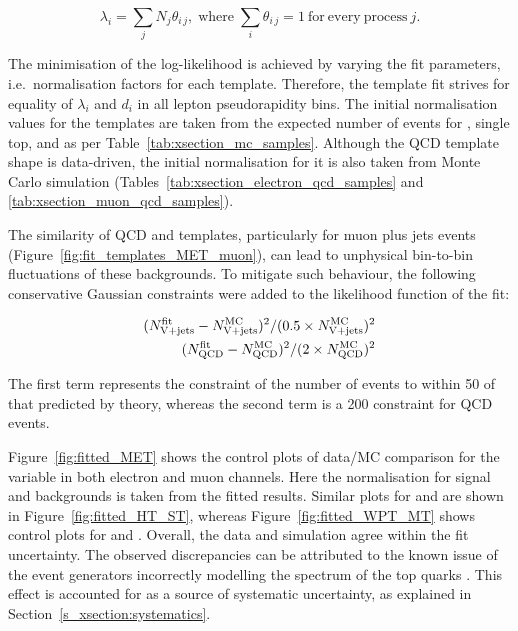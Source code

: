 \begin{equation}
\label{eq:xsection_templates_normalisation}
\lambda_i=\sum\limits_{j}N_j\theta_{i\,j},\;\mathrm{where}\;\sum\limits_{i}\theta_{i\,j}=1~\mathrm{for~every~process}~j.
\end{equation}

The minimisation of the log-likelihood is achieved by varying the fit parameters, i.e.\ normalisation factors for each
template. Therefore, the template fit strives for equality of $\lambda_i$ and $d_i$ in all lepton pseudorapidity bins.
The initial normalisation values for the templates are taken from the expected number of events for \ttbar, single top,
\WpJets and \ZpJets as per Table~\ref{tab:xsection_mc_samples}. Although the QCD template shape is data-driven, the
initial normalisation for it is also taken from Monte Carlo simulation (Tables~\ref{tab:xsection_electron_qcd_samples}
and \ref{tab:xsection_muon_qcd_samples}).

The similarity of QCD and \VpJets templates, particularly for muon plus jets events
(Figure~\ref{fig:fit_templates_MET_muon}), can lead to unphysical bin-to-bin fluctuations of these backgrounds. To
mitigate such behaviour, the following conservative Gaussian constraints were added to the likelihood function of the
fit:

\begin{align}
\label{eq:xsection_fit_constraints}
(N_{\mathrm{V}+\textrm{jets}}^\mathrm{fit}-N_{\mathrm{V}+\textrm{jets}}^\mathrm{MC})^2/(0.5 \times N_{\mathrm{V}+\textrm{jets}}^\mathrm{MC})^2 \\
(N_\mathrm{QCD}^\mathrm{fit}-N_\mathrm{QCD}^\mathrm{MC})^2/(2\times N_\mathrm{QCD}^\mathrm{MC})^2
\end{align}

The first term represents the constraint of the number of \VpJets events to within \SI{50}{\pc} of that predicted by
theory, whereas the second term is a \SI{200}{\pc} constraint for QCD events.

Figure~\ref{fig:fitted_MET} shows the control plots of data/MC comparison for the \MET variable in both electron and
muon channels. Here the normalisation for signal and backgrounds is taken from the fitted results. Similar plots for \HT
and \ST are shown in Figure~\ref{fig:fitted_HT_ST}, whereas Figure~\ref{fig:fitted_WPT_MT} shows control plots for \WPT
and \MT. Overall, the data and simulation agree within the fit uncertainty. The observed discrepancies can be attributed
to the known issue of the event generators incorrectly modelling the \pt spectrum of the top quarks
\autocite{ttbar_differential_xsection_7TeV, ttbar_differential_xsection_8TeV}. This effect is accounted for as a source
of systematic uncertainty, as explained in Section~\ref{s_xsection:systematics}.

